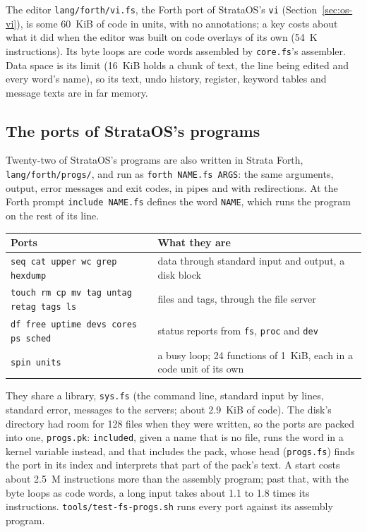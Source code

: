 The editor \texttt{lang/forth/vi.fs}, the Forth port of StrataOS's \texttt{vi}
(Section~\ref{sec:os-vi}), is some 60~KiB of code in units, with no annotations; a key costs about
what it did when the editor was built on code overlays of its own (54~K instructions). Its byte loops
are code words assembled by \texttt{core.fs}'s assembler. Data space is its limit (16~KiB holds a
chunk of text, the line being edited and every word's name), so its text, undo history, register,
keyword tables and message texts are in far memory.

\subsection{The ports of StrataOS's programs}\label{sec:forth-progs}
Twenty-two of StrataOS's programs are also written in Strata Forth, \texttt{lang/forth/progs/},
and run as \texttt{forth NAME.fs ARGS}: the same arguments, output, error messages and exit codes,
in pipes and with redirections. At the Forth prompt \texttt{include NAME.fs} defines the word
\texttt{NAME}, which runs the program on the rest of its line.

\begin{center}\small
\begin{tabular}{@{}l l@{}}
\toprule
\textbf{Ports} & \textbf{What they are}\\\midrule
\texttt{seq cat upper wc grep hexdump} & data through standard input and output, a disk block\\
\texttt{touch rm cp mv tag untag retag tags ls} & files and tags, through the file server\\
\texttt{df free uptime devs cores ps sched} & status reports from \texttt{fs}, \texttt{proc} and \texttt{dev}\\
\texttt{spin units} & a busy loop; 24 functions of 1~KiB, each in a code unit of its own\\
\bottomrule
\end{tabular}
\end{center}

They share a library, \texttt{sys.fs} (the command line, standard input by lines, standard error,
messages to the servers; about 2.9~KiB of code). The disk's directory had room for 128 files when they were written, so
the ports are packed into one, \texttt{progs.pk}: \texttt{included}, given a name that is no file,
runs the word in a kernel variable instead, and that includes the pack, whose head
(\texttt{progs.fs}) finds the port in its index and interprets that part of the pack's text. A start costs about 2.5~M instructions more
than the assembly program; past that, with the byte loops as code words, a long input takes about
1.1 to 1.8 times its instructions. \texttt{tools/test-fs-progs.sh} runs every port against its
assembly program.
